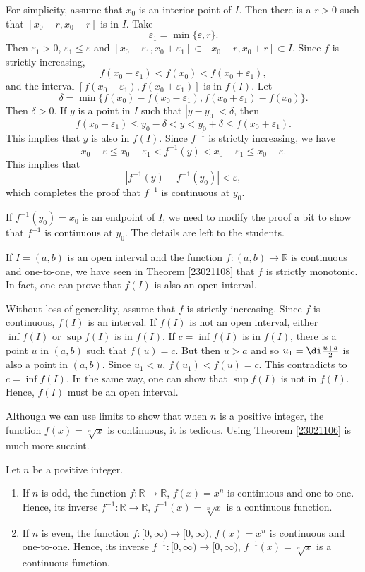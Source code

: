 \begin{example}
\begin{myproof}
For simplicity, assume that $x_0$ is an interior point of $I$. Then there is a $r>0$ such that $[x_0-r,x_0+r]$ is in $I$. 
Take \[\varepsilon_1=\min\{\varepsilon, r\}.\] Then $\varepsilon_1>0$, $\varepsilon_1\leq \varepsilon$ and $[x_0-\varepsilon_1, x_0+\varepsilon_1]\subset [x_0-r, x_0+r]\subset I$.
Since $f$ is strictly increasing,
\[f(x_0-\varepsilon_1)<f(x_0)<f(x_0+\varepsilon_1),\]and the interval $[f(x_0-\varepsilon_1), f(x_0+\varepsilon_1)]$ is in $f(I)$. 
Let
\[\delta=\min\{f(x_0)-f(x_0-\varepsilon_1), f(x_0+\varepsilon_1)-f(x_0)\}.\]
Then $\delta>0$. If $y$ is a point in $I$ such that $|y-y_0|<\delta$, then \[f(x_0-\varepsilon_1)\leq y_0-\delta<y<y_0+\delta\leq f(x_0+\varepsilon_1).\]This implies that $y$ is also in $f(I)$.  Since $f^{-1}$ is  strictly increasing, we have
\[x_0-\varepsilon\leq x_0-\varepsilon_1<f^{-1}(y)<x_0+\varepsilon_1\leq x_0+\varepsilon.\]This implies that
\[|f^{-1}(y)-f^{-1}(y_0)|<\varepsilon,\]which completes the proof that $f^{-1}$ is continuous at $y_0$.

If $f^{-1}(y_0)=x_0$ is an endpoint of $I$, we need to modify the proof a bit to show that $f^{-1}$ is continuous at $y_0$. The details are left to the students.

\end{myproof}

\begin{remark}{}
If $I=(a, b)$ is an open interval and the function $f:(a, b)\to \mathbb{R}$ is continuous and one-to-one, we have seen in Theorem \ref{23021108} that $f$ is strictly monotonic. In fact, one can prove that $f(I)$ is also an open interval. 

Without loss of generality, assume that $f$ is strictly increasing.   Since $f$ is continuous, $f(I)$ is an interval. If $f(I)$ is not an open interval, either $\inf f(I)$ or $\sup f(I)$ is in $f(I)$. If $c=\inf f(I)$ is in $f(I)$, there is a point $u$ in $(a, b)$ such that $f(u)=c$. But then $u>a$ and so $u_1=\di \frac{u+a}{2}$ is also a point in $(a,b)$. Since $u_1<u$, $f(u_1)<f(u)=c$. This contradicts to $c=\inf f(I)$. In the same way, one can show that $\sup f(I)$ is not in $f(I)$. Hence, $f(I)$ must be an open interval.
\end{remark}

Although we can use limits to show that when $n$ is a positive integer, the  function $f(x)=\sqrt[n]{x}$ is continuous, it is tedious. Using Theorem \ref{23021106} is much more succint.
\begin{example}{}
Let $n$ be a positive integer. 
\begin{enumerate}[1.]
\item If $n$ is odd, the function $f:\mathbb{R}\to\mathbb{R}$, $f(x)=x^n$ is continuous and  one-to-one. Hence, its inverse
$f^{-1}:\mathbb{R}\to\mathbb{R}$, $f^{-1}(x)=\sqrt[n]{x}$ is a continuous function.
\item If $n$ is even, the function $f:[0,\infty)\to[0,\infty)$, $f(x)=x^n$ is continuous and  one-to-one. Hence, its inverse
$f^{-1}:[0,\infty)\to[0,\infty)$, $f^{-1}(x)=\sqrt[n]{x}$ is a continuous function.
\end{enumerate}
\end{example}



\end{example}
